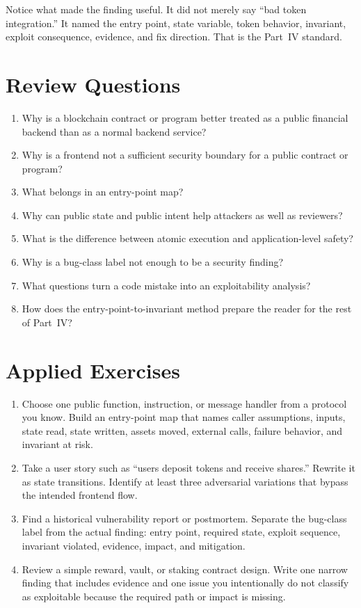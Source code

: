 Notice what made the finding useful. It did not merely say ``bad token integration.'' It named the entry point, state variable, token behavior, invariant, exploit consequence, evidence, and fix direction. That is the Part~IV standard.

\section*{Review Questions}

\begin{enumerate}
\item Why is a blockchain contract or program better treated as a public financial backend than as a normal backend service?
\item Why is a frontend not a sufficient security boundary for a public contract or program?
\item What belongs in an entry-point map?
\item Why can public state and public intent help attackers as well as reviewers?
\item What is the difference between atomic execution and application-level safety?
\item Why is a bug-class label not enough to be a security finding?
\item What questions turn a code mistake into an exploitability analysis?
\item How does the entry-point-to-invariant method prepare the reader for the rest of Part~IV?
\end{enumerate}

\section*{Applied Exercises}

\begin{enumerate}
\item Choose one public function, instruction, or message handler from a protocol you know. Build an entry-point map that names caller assumptions, inputs, state read, state written, assets moved, external calls, failure behavior, and invariant at risk.

\item Take a user story such as ``users deposit tokens and receive shares.'' Rewrite it as state transitions. Identify at least three adversarial variations that bypass the intended frontend flow.

\item Find a historical vulnerability report or postmortem. Separate the bug-class label from the actual finding: entry point, required state, exploit sequence, invariant violated, evidence, impact, and mitigation.

\item Review a simple reward, vault, or staking contract design. Write one narrow finding that includes evidence and one issue you intentionally do not classify as exploitable because the required path or impact is missing.
\end{enumerate}
